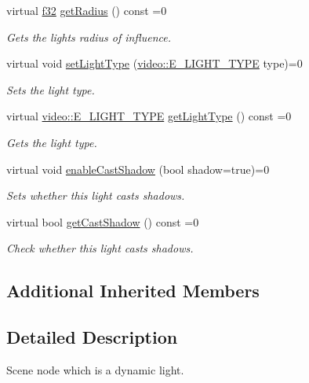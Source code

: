 \begin{DoxyCompactItemize}
virtual \hyperlink{namespaceirr_a0277be98d67dc26ff93b1a6a1d086b07}{f32} \hyperlink{classirr_1_1scene_1_1ILightSceneNode_a50052a152ede23b2253819abbbd4598d}{get\+Radius} () const  =0
\begin{DoxyCompactList}\small\item\em Gets the light\textquotesingle{}s radius of influence. \end{DoxyCompactList}\item 
virtual void \hyperlink{classirr_1_1scene_1_1ILightSceneNode_a18b3c0ba831bdc9166db341a35701c9b}{set\+Light\+Type} (\hyperlink{namespaceirr_1_1video_aaf0e02f6f83cc35cf9e764bf18400d39}{video\+::\+E\+\_\+\+L\+I\+G\+H\+T\+\_\+\+T\+Y\+PE} type)=0
\begin{DoxyCompactList}\small\item\em Sets the light type. \end{DoxyCompactList}\item 
virtual \hyperlink{namespaceirr_1_1video_aaf0e02f6f83cc35cf9e764bf18400d39}{video\+::\+E\+\_\+\+L\+I\+G\+H\+T\+\_\+\+T\+Y\+PE} \hyperlink{classirr_1_1scene_1_1ILightSceneNode_ac961abe6a318e3167c998680ff51ff52}{get\+Light\+Type} () const  =0
\begin{DoxyCompactList}\small\item\em Gets the light type. \end{DoxyCompactList}\item 
virtual void \hyperlink{classirr_1_1scene_1_1ILightSceneNode_a1520d051fe04bc8c5c8975fb3908161b}{enable\+Cast\+Shadow} (bool shadow=true)=0
\begin{DoxyCompactList}\small\item\em Sets whether this light casts shadows. \end{DoxyCompactList}\item 
virtual bool \hyperlink{classirr_1_1scene_1_1ILightSceneNode_aa3e1cc720dd0aeded8ae30095e8afa47}{get\+Cast\+Shadow} () const  =0
\begin{DoxyCompactList}\small\item\em Check whether this light casts shadows. \end{DoxyCompactList}\end{DoxyCompactItemize}
\subsection*{Additional Inherited Members}


\subsection{Detailed Description}
Scene node which is a dynamic light. 


